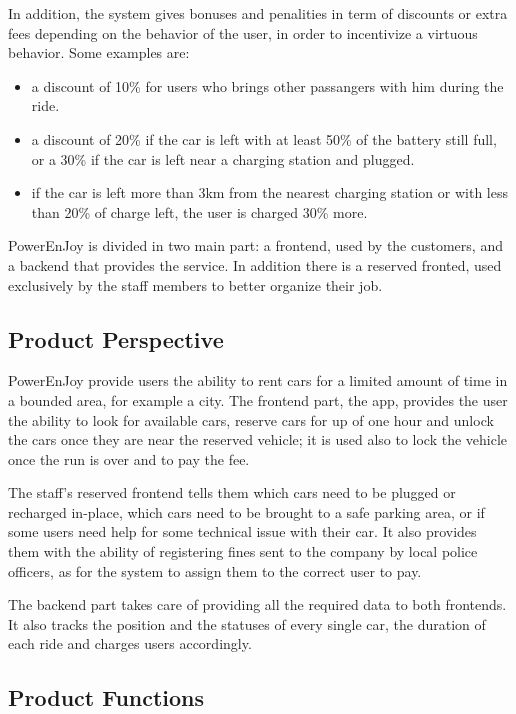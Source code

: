 \documentclass[11pt]{article} %
\newcommand{\pe}{PowerEnJoy }
\begin{document}
In addition, the system gives bonuses and penalities in term of discounts or extra fees depending on the behavior of the user, in order to incentivize a virtuous behavior. Some examples are:

\begin{itemize}
	\item a discount of 10\% for users who brings other passangers with him during the ride.
	\item a discount of 20\% if the car is left with at least 50\% of the battery still full, or a 30\% if the car is left near a charging station and plugged.
	\item if the car is left more than 3km from the nearest charging station or with less than 20\% of charge left, the user is charged 30\% more.
\end{itemize}

\pe is divided in two main part: a frontend, used by the customers, and a backend that provides the service. In addition there is a reserved fronted, used exclusively by the staff members to better organize their job.


\subsection{Product Perspective}
  
  \pe provide users the ability to rent cars for a limited amount of time in a bounded area, for example a city. 
  The frontend part, the app, provides the user the ability to look for available cars, reserve cars for up of one hour and unlock the cars once they are near the reserved vehicle; it is used also to lock the vehicle once the run is over and to pay the fee.

The staff's reserved frontend tells them which cars need to be plugged or recharged in-place, which cars need to be brought to a safe parking area, or if some users need help for some technical issue with their car. It also provides them with the ability of registering fines sent to the company by local police officers, as for the system to assign them to the correct user to pay.

  The backend part takes care of providing all the required data to both frontends. It also tracks the position and the statuses of every single car, the duration of each ride and charges users accordingly.
  
\subsection{Product Functions}
  
\end{document}
